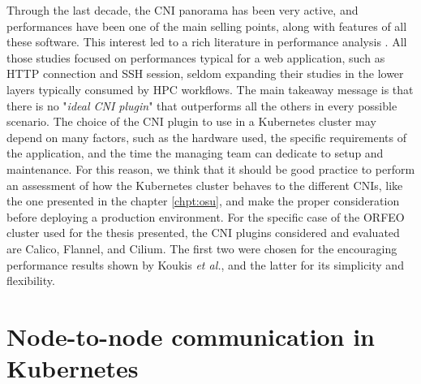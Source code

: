 Through the last decade, the CNI panorama has been very active, and performances
have been one of the main selling points, along with features of all these
software. This interest led to a rich literature in performance analysis
\cite{Kapoius2020,Kang2021, Qi_2021,Koukis2024}. All those studies focused on
performances typical for a web application, such as HTTP connection and SSH
session, seldom expanding their studies in the lower layers typically consumed
by HPC workflows. The main takeaway message is that there is no "\textit{ideal
CNI plugin}" that outperforms all the others in every possible scenario. The
choice of the CNI plugin to use in a Kubernetes cluster may depend on many
factors, such as the hardware used, the specific requirements of the
application, and the time the managing team can dedicate to setup and
maintenance. For this reason, we think that it should be good practice to
perform an assessment of how the Kubernetes cluster behaves to the different
CNIs, like the one presented in the chapter \ref{chpt:osu}, and make the proper
consideration before deploying a production environment. For the specific case
of the ORFEO cluster used for the thesis presented, the CNI plugins considered
and evaluated are Calico, Flannel, and Cilium. The first two were chosen for the
encouraging performance results shown by Koukis \emph{et al.}\cite{Koukis2024},
and the latter for its simplicity and flexibility.



\section{Node-to-node communication in Kubernetes}\label{sec:node2node}

